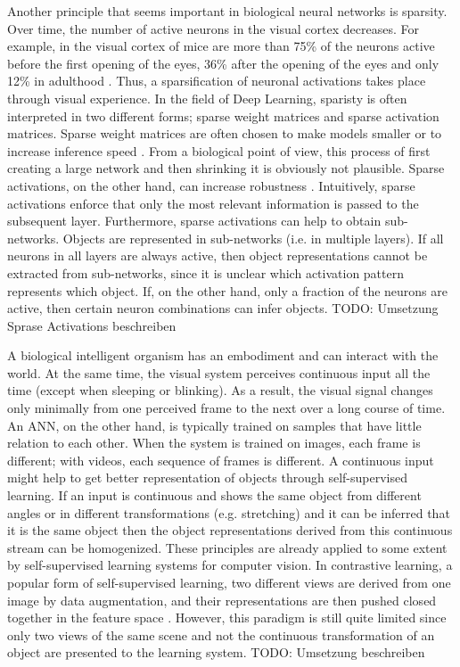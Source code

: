 Another principle that seems important in biological neural networks is sparsity.
Over time, the number of active neurons in the visual cortex decreases.
For example, in the visual cortex of mice are more than 75\% of the neurons active before the first opening of the eyes, 36\% after the opening of the eyes and only 12\% in adulthood .
Thus, a sparsification of neuronal activations takes place through visual experience.
In the field of Deep Learning, sparisty is often interpreted in two different forms; sparse weight matrices and sparse activation matrices.
Sparse weight matrices are often chosen to make models smaller or to increase inference speed \cite{Louizos_Welling_Kingma_2018, Nun_Dryden_Peste_2021}.
From a biological point of view, this process of first creating a large network and then shrinking it is obviously not plausible.
Sparse activations, on the other hand, can increase robustness \cite{Panousis_Chatzis_Theodoridis_2021}.
Intuitively, sparse activations enforce that only the most relevant information is passed to the subsequent layer.
Furthermore, sparse activations can help to obtain sub-networks.
Objects are represented in sub-networks (i.e. in multiple layers).
If all neurons in all layers are always active, then object representations cannot be extracted from sub-networks, since it is unclear which activation pattern represents which object.
If, on the other hand, only a fraction of the neurons are active, then certain neuron combinations can infer objects.
TODO: Umsetzung Sprase Activations beschreiben

A biological intelligent organism has an embodiment and can interact with the world.
At the same time, the visual system perceives continuous input all the time (except when sleeping or blinking).
As a result, the visual signal changes only minimally from one perceived frame to the next over a long course of time.
An ANN, on the other hand, is typically trained on samples that have little relation to each other.
When the system is trained on images, each frame is different; with videos, each sequence of frames is different.
A continuous input might help to get better representation of objects through self-supervised learning.
If an input is continuous and shows the same object from different angles or in different transformations (e.g. stretching) and it can be inferred that it is the same object then the object representations derived from this continuous stream can be homogenized.
These principles are already applied to some extent by self-supervised learning systems for computer vision.
In contrastive learning, a popular form of self-supervised learning, two different views are derived from one image by data augmentation, and their representations are then pushed closed together in the feature space .
However, this paradigm is still quite limited since only two views of the same scene and not the continuous transformation of an object are presented to the learning system.
TODO: Umsetzung beschreiben

